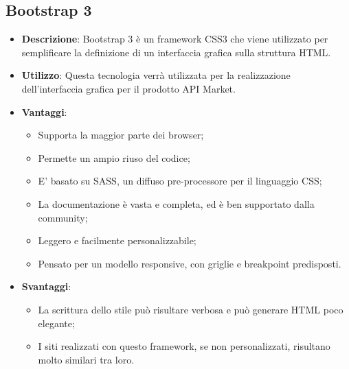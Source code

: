 \subsection{Bootstrap 3}
\begin{itemize}
	\item \textbf{Descrizione}: Bootstrap 3 è un framework CSS3 che viene utilizzato per semplificare la definizione di un interfaccia grafica sulla struttura HTML.
	\item \textbf{Utilizzo}: Questa tecnologia verrà utilizzata per la realizzazione dell'interfaccia grafica per il prodotto API Market.
	\item \textbf{Vantaggi}:
	\begin{itemize}
		\item Supporta la maggior parte dei browser;
		\item Permette un ampio riuso del codice;
		\item E' basato su SASS, un diffuso pre-processore per il linguaggio CSS;
		\item La documentazione è vasta e completa, ed è ben supportato dalla community;
		\item Leggero e facilmente personalizzabile;
		\item Pensato per un modello responsive, con griglie e breakpoint predisposti.
	\end{itemize}
	\item \textbf{Svantaggi}:
	\begin{itemize}
		\item La scrittura dello stile può risultare verbosa e può generare HTML poco elegante;
		\item I siti realizzati con questo framework, se non personalizzati, risultano molto similari tra loro.
	\end{itemize}
\end{itemize}

